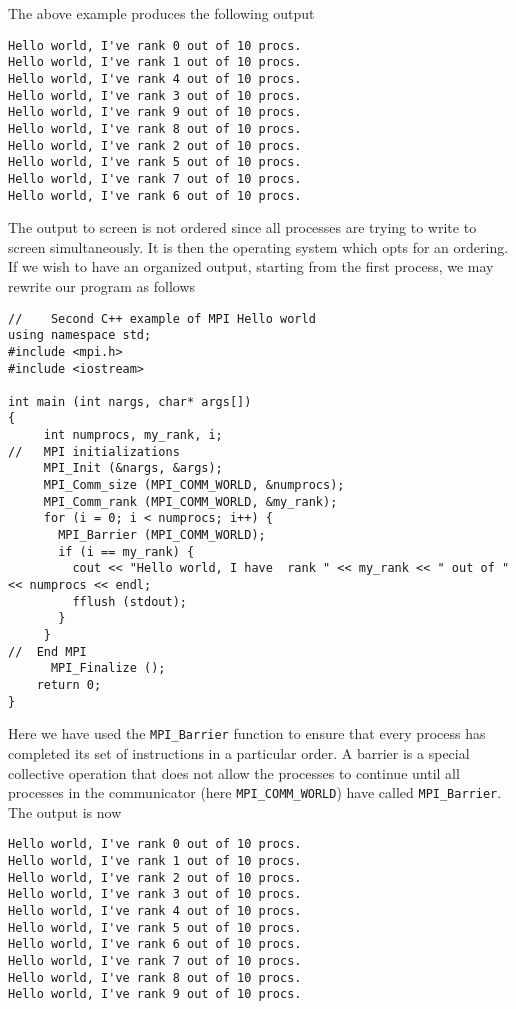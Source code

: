 The above example produces the following output
\begin{svgraybox}
\begin{verbatim}
Hello world, I've rank 0 out of 10 procs.
Hello world, I've rank 1 out of 10 procs.
Hello world, I've rank 4 out of 10 procs.
Hello world, I've rank 3 out of 10 procs.
Hello world, I've rank 9 out of 10 procs.
Hello world, I've rank 8 out of 10 procs.
Hello world, I've rank 2 out of 10 procs.
Hello world, I've rank 5 out of 10 procs.
Hello world, I've rank 7 out of 10 procs.
Hello world, I've rank 6 out of 10 procs.
\end{verbatim}
\end{svgraybox}
The output to screen is not ordered since all processes are trying to write  to screen simultaneously.
It is then the operating system which opts for an ordering.  
If we wish to have an organized output, starting from the first process, we may rewrite our program as follows
\lstset{language=c++}
\begin{lstlisting}[title={\url{http://folk.uio.no/mhjensen/compphys/programs/chapter05/program3.cpp}}]
//    Second C++ example of MPI Hello world
using namespace std;
#include <mpi.h>
#include <iostream>

int main (int nargs, char* args[])
{
     int numprocs, my_rank, i;
//   MPI initializations
     MPI_Init (&nargs, &args);
     MPI_Comm_size (MPI_COMM_WORLD, &numprocs);
     MPI_Comm_rank (MPI_COMM_WORLD, &my_rank);
     for (i = 0; i < numprocs; i++) {
       MPI_Barrier (MPI_COMM_WORLD);
       if (i == my_rank) {
         cout << "Hello world, I have  rank " << my_rank << " out of " << numprocs << endl;
         fflush (stdout);
       }
     }
//  End MPI
      MPI_Finalize ();
    return 0;
}
\end{lstlisting}
Here we have used the \lstinline{MPI_Barrier} function to ensure that
every process has completed  its set of instructions in  a particular order.
A barrier is a special collective operation that does not allow the processes to continue
until all processes in the communicator (here \lstinline{MPI_COMM_WORLD}) have called 
\lstinline{MPI_Barrier}. 
The output is now
\begin{svgraybox}
\begin{verbatim}
Hello world, I've rank 0 out of 10 procs.
Hello world, I've rank 1 out of 10 procs.
Hello world, I've rank 2 out of 10 procs.
Hello world, I've rank 3 out of 10 procs.
Hello world, I've rank 4 out of 10 procs.
Hello world, I've rank 5 out of 10 procs.
Hello world, I've rank 6 out of 10 procs.
Hello world, I've rank 7 out of 10 procs.
Hello world, I've rank 8 out of 10 procs.
Hello world, I've rank 9 out of 10 procs.
\end{verbatim}
\end{svgraybox}
